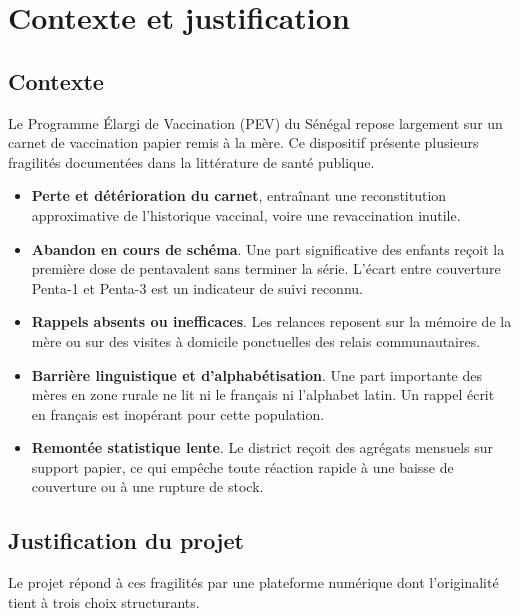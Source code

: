 \documentclass[11pt,a4paper]{article}
\begin{document}
\clearpage
{}
\setcounter{page}{1}

\section{Contexte et justification}

\subsection{Contexte}

Le Programme Élargi de Vaccination (PEV) du Sénégal repose largement sur un carnet de
vaccination papier remis à la mère. Ce dispositif présente plusieurs fragilités
documentées dans la littérature de santé publique.

\begin{itemize}
  \item \textbf{Perte et détérioration du carnet}, entraînant une reconstitution
        approximative de l'historique vaccinal, voire une revaccination inutile.
  \item \textbf{Abandon en cours de schéma}. Une part significative des enfants reçoit
        la première dose de pentavalent sans terminer la série. L'écart entre couverture
        Penta-1 et Penta-3 est un indicateur de suivi reconnu.
  \item \textbf{Rappels absents ou inefficaces}. Les relances reposent sur la mémoire de
        la mère ou sur des visites à domicile ponctuelles des relais communautaires.
  \item \textbf{Barrière linguistique et d'alphabétisation}. Une part importante des mères
        en zone rurale ne lit ni le français ni l'alphabet latin. Un rappel écrit en
        français est inopérant pour cette population.
  \item \textbf{Remontée statistique lente}. Le district reçoit des agrégats mensuels sur
        support papier, ce qui empêche toute réaction rapide à une baisse de couverture
        ou à une rupture de stock.
\end{itemize}

\subsection{Justification du projet}

Le projet répond à ces fragilités par une plateforme numérique dont l'originalité tient
à trois choix structurants.
\end{document}
